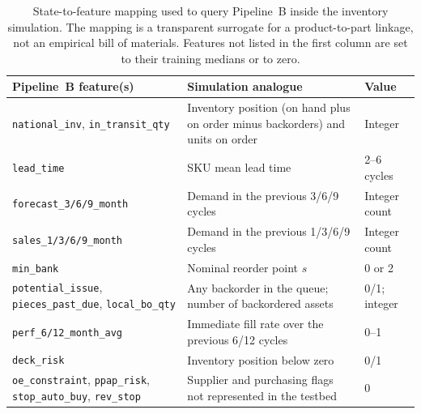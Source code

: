 \begin{table}[H]
\centering
\caption{State-to-feature mapping used to query Pipeline~B inside the inventory simulation. The mapping is a transparent surrogate for a product-to-part linkage, not an empirical bill of materials. Features not listed in the first column are set to their training medians or to zero.}
\label{tab:b-mapping}
\footnotesize
\setlength{\tabcolsep}{3pt}
\begin{tabular}{p{3.4cm}p{7.6cm}p{2.4cm}}
\toprule
Pipeline~B feature(s) & Simulation analogue & Value \\
\midrule
\texttt{national\_inv}, \texttt{in\_transit\_qty} & Inventory position (on hand plus on order minus backorders) and units on order & Integer \\
\texttt{lead\_time} & SKU mean lead time & 2--6 cycles \\
\texttt{forecast\_3/6/9\_month} & Demand in the previous 3/6/9 cycles & Integer count \\
\texttt{sales\_1/3/6/9\_month} & Demand in the previous 1/3/6/9 cycles & Integer count \\
\texttt{min\_bank} & Nominal reorder point $s$ & 0 or 2 \\
\texttt{potential\_issue}, \texttt{pieces\_past\_due}, \texttt{local\_bo\_qty} & Any backorder in the queue; number of backordered assets & 0/1; integer \\
\texttt{perf\_6/12\_month\_avg} & Immediate fill rate over the previous 6/12 cycles & 0--1 \\
\texttt{deck\_risk} & Inventory position below zero & 0/1 \\
\texttt{oe\_constraint}, \texttt{ppap\_risk}, \texttt{stop\_auto\_buy}, \texttt{rev\_stop} & Supplier and purchasing flags not represented in the testbed & 0 \\
\bottomrule
\end{tabular}
\end{table}
